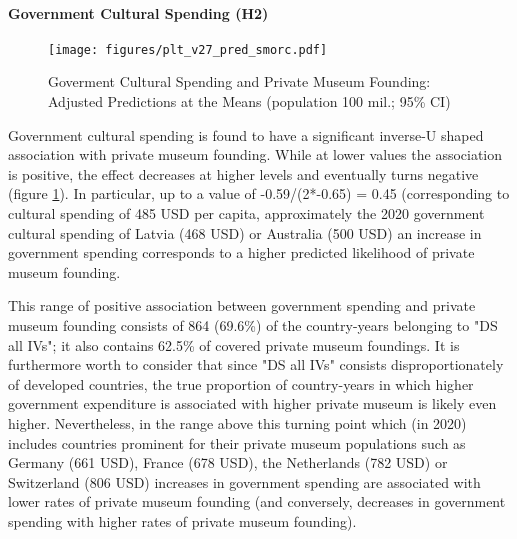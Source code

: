 \documentclass[11pt]{article}
\begin{document}
\paragraph*{Government Cultural Spending (H2)}

\begin{figure}[htbp]
\centering
\texttt{[image: figures/plt\_v27\_pred\_smorc.pdf]}
\caption{\label{fig:pred_smorc}Goverment Cultural Spending and Private Museum Founding: Adjusted Predictions at the Means (population 100 mil.; 95\% CI)}
\end{figure}

Government cultural spending is found to have a significant inverse-U shaped association with private museum founding.
While at lower values the association is positive, the effect decreases at higher levels and eventually turns negative (figure \ref{fig:pred_smorc}).
In particular, up to a value of -0.59/(2*-0.65) = 0.45 (corresponding to cultural spending of 485 USD per capita, approximately the 2020 government cultural spending of Latvia (468 USD) or Australia (500 USD) an increase in government spending corresponds to a higher predicted likelihood of private museum founding.


This range of positive association between government spending and private museum founding consists of 864 (69.6\%) of the country-years belonging to "DS all IVs"; it also contains 62.5\% of covered private museum foundings.
It is furthermore worth to consider that since "DS all IVs" consists disproportionately of developed countries, the true proportion of country-years in which higher government expenditure is associated with higher private museum is likely even higher.
Nevertheless, in the range above this turning point which (in 2020) includes countries prominent for their private museum populations such as Germany (661 USD), France (678 USD), the Netherlands (782 USD) or Switzerland (806 USD) increases in government spending are associated with lower rates of private museum founding (and conversely, decreases in government spending with higher rates of private museum founding).
\end{document}
